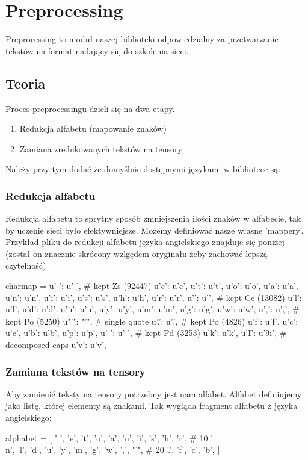 \newpage
\section{Preprocessing}

Preprocessing to moduł naszej biblioteki odpowiedzialny za przetwarzanie tekstów na format
nadający się do szkolenia sieci. 

\subsection{Teoria}

Proces preprocessingu dzieli się na dwa etapy.
\begin{enumerate}
	\item Redukcja alfabetu (mapowanie znaków)
	\item Zamiana zredukowanych tekstów na tensory
\end{enumerate}

Należy przy tym dodać że domyślnie dostępnymi językami w bibliotece są:
\languages 


\subsubsection{Redukcja alfabetu}
Redukcja alfabetu to sprytny sposób zmniejszenia ilości znaków w alfabecie, tak by uczenie sieci było
efektywniejsze. Możemy definiować nasze własne 'mappery'. Przykład pliku do redukcji alfabetu języka
angielskiego znajduje się poniżej (został on znacznie skrócony wzlgędem oryginału żeby zachować lepszą
czytelność)

\begin{python}
charmap = {
    u' ': u' ',                 # kept Zs (92447)
    u'e': u'e',
    u't': u't',
    u'o': u'o',
    u'a': u'a',
    u'n': u'n',
    u'i': u'i',
    u's': u's',
    u'h': u'h',
    u'r': u'r',
    u'\n': u'\n',               # kept Cc (13082)
    u'l': u'l',
    u'd': u'd',
    u'u': u'u',
    u'y': u'y',
    u'm': u'm',
    u'g': u'g',
    u'w': u'w',
    u',': u',',                 # kept Po (5250)
    u"'": "'",                  # single quote
    u'.': u'.',                 # kept Po (4826)
    u'f': u'f',
    u'c': u'c',
    u'b': u'b',
    u'p': u'p',
    u'-': u'-',                 # kept Pd (3253)
    u'k': u'k',
    u'I': u'\xb9i',             # decomposed caps
    u'v': u'v',
}
\end{python}

\newpage
\subsubsection{Zamiana tekstów na tensory}
Aby zamienić teksty na tensory potrzebny jest nam alfabet. Alfabet definiujemy jako listę, której 
elementy są znakami. Tak wygląda fragment alfabetu z języka angielskiego:
\begin{python}
alphabet = [
    ' ',
    'e',
    't',
    'o',
    'a',
    'n',
    'i',
    's',
    'h',
    'r',  # 10
    '\\n',
    'l',
    'd',
    'u',
    'y',
    'm',
    'g',
    'w',
    ',',
    "'",  # 20
    '.',
    'f',
    'c',
    'b',
]
\end{python}

